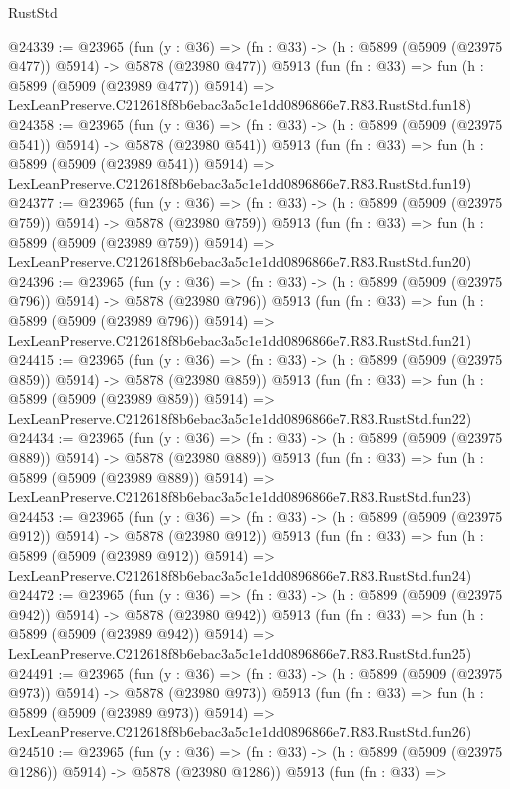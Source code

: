 \begin{lexlean}{RustStd}
\begin{coremodule}
{{@24339 := @23965
    (fun (y : @36) => (fn : @33) -> (h : @5899 (@5909 (@23975 @477)) @5914) -> @5878 (@23980 @477))
    @5913
    (fun (fn : @33) =>
    fun (h : @5899 (@5909 (@23989 @477)) @5914) =>
    LexLeanPreserve.C212618f8b6ebac3a5c1e1dd0896866e7.R83.RustStd.fun18)
@24358 := @23965
    (fun (y : @36) => (fn : @33) -> (h : @5899 (@5909 (@23975 @541)) @5914) -> @5878 (@23980 @541))
    @5913
    (fun (fn : @33) =>
    fun (h : @5899 (@5909 (@23989 @541)) @5914) =>
    LexLeanPreserve.C212618f8b6ebac3a5c1e1dd0896866e7.R83.RustStd.fun19)
@24377 := @23965
    (fun (y : @36) => (fn : @33) -> (h : @5899 (@5909 (@23975 @759)) @5914) -> @5878 (@23980 @759))
    @5913
    (fun (fn : @33) =>
    fun (h : @5899 (@5909 (@23989 @759)) @5914) =>
    LexLeanPreserve.C212618f8b6ebac3a5c1e1dd0896866e7.R83.RustStd.fun20)
@24396 := @23965
    (fun (y : @36) => (fn : @33) -> (h : @5899 (@5909 (@23975 @796)) @5914) -> @5878 (@23980 @796))
    @5913
    (fun (fn : @33) =>
    fun (h : @5899 (@5909 (@23989 @796)) @5914) =>
    LexLeanPreserve.C212618f8b6ebac3a5c1e1dd0896866e7.R83.RustStd.fun21)
@24415 := @23965
    (fun (y : @36) => (fn : @33) -> (h : @5899 (@5909 (@23975 @859)) @5914) -> @5878 (@23980 @859))
    @5913
    (fun (fn : @33) =>
    fun (h : @5899 (@5909 (@23989 @859)) @5914) =>
    LexLeanPreserve.C212618f8b6ebac3a5c1e1dd0896866e7.R83.RustStd.fun22)
@24434 := @23965
    (fun (y : @36) => (fn : @33) -> (h : @5899 (@5909 (@23975 @889)) @5914) -> @5878 (@23980 @889))
    @5913
    (fun (fn : @33) =>
    fun (h : @5899 (@5909 (@23989 @889)) @5914) =>
    LexLeanPreserve.C212618f8b6ebac3a5c1e1dd0896866e7.R83.RustStd.fun23)
@24453 := @23965
    (fun (y : @36) => (fn : @33) -> (h : @5899 (@5909 (@23975 @912)) @5914) -> @5878 (@23980 @912))
    @5913
    (fun (fn : @33) =>
    fun (h : @5899 (@5909 (@23989 @912)) @5914) =>
    LexLeanPreserve.C212618f8b6ebac3a5c1e1dd0896866e7.R83.RustStd.fun24)
@24472 := @23965
    (fun (y : @36) => (fn : @33) -> (h : @5899 (@5909 (@23975 @942)) @5914) -> @5878 (@23980 @942))
    @5913
    (fun (fn : @33) =>
    fun (h : @5899 (@5909 (@23989 @942)) @5914) =>
    LexLeanPreserve.C212618f8b6ebac3a5c1e1dd0896866e7.R83.RustStd.fun25)
@24491 := @23965
    (fun (y : @36) => (fn : @33) -> (h : @5899 (@5909 (@23975 @973)) @5914) -> @5878 (@23980 @973))
    @5913
    (fun (fn : @33) =>
    fun (h : @5899 (@5909 (@23989 @973)) @5914) =>
    LexLeanPreserve.C212618f8b6ebac3a5c1e1dd0896866e7.R83.RustStd.fun26)
@24510 := @23965
    (fun (y : @36) =>
    (fn : @33) -> (h : @5899 (@5909 (@23975 @1286)) @5914) -> @5878 (@23980 @1286))
    @5913
    (fun (fn : @33) =>
}}
\end{coremodule}
\end{lexlean}
